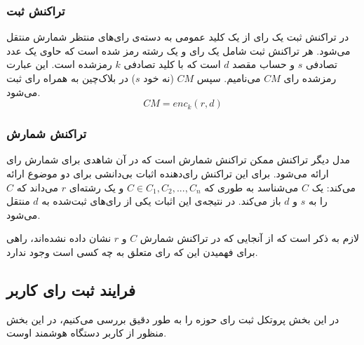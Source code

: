 \subsubsection{تراکنش ثبت}
در تراکنش ثبت یک رای از یک کلید عمومی به دسته‌ی رای‌های منتظر شمارش منتقل می‌شود. هر تراکنش ثبت شامل یک رای و یک رشته 
رمز شده است که حاوی یک عدد تصادفی $s$ و حساب مقصد $d$ است که با کلید تصادفی $k$ رمزشده است. این عبارت رمز‌شده رای $CM$ می‌نامیم. سپس $CM$ (نه خود $s$) در بلاک‌چین به همراه رای ثبت می‌شود.
\\
\begin{equation}
CM = enc_{k} (r, d)
\label{eq:enc}
\end{equation}
\subsubsection{تراکنش شمارش}
مدل دیگر تراکنش ممکن تراکنش شمارش است که در آن شاهدی برای شمارش رای ارائه می‌شود. برای این تراکنش رای‌دهنده اثبات بی‌دانشی برای دو موضوع ارائه می‌کند: یک $C$ می‌شناسد به طوری که  $C \in C_1, C_2, ... ,C_n$ و یک رشته‌ای $r$ می‌داند که $C$ را به $s$ و $d$ باز می‌کند. در نتیجه‌ی این اثبات یکی از رای‌های ثبت‌شده به $d$ منتقل می‌شود.
\par
لازم به ذکر است که از آنجایی که در تراکنش شمارش $C$ و $r$ نشان داده نشده‌اند، راهی برای فهمیدن این که رای متعلق به چه کسی است وجود ندارد.

\subsection{فرایند ثبت رای کاربر}
در این بخش پروتکل ثبت رای حوزه را به طور دقیق بررسی می‌کنیم، در این بخش منظور از کاربر دستگاه هوشمند اوست. 

